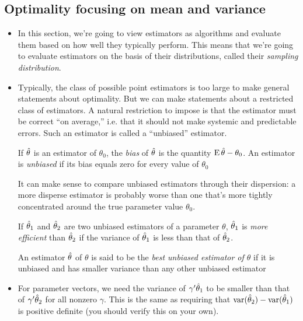 \subsection{Optimality focusing on mean and variance}

\begin{itemize}[leftmargin=0pt]

\item In this section, we're going to view estimators as algorithms
  and evaluate them based on how well they typically perform.  This
  means that we're going to evaluate estimators on the basis of their
  distributions, called their \emph{sampling distribution}.  

\item Typically, the class of possible point estimators is too large
  to make general statements about optimality.  But we can make
  statements about a restricted class of estimators.  A natural
  restriction to impose is that the estimator must be correct ``on
  average,'' i.e. that it should not make systemic and predictable
  errors.  Such an estimator is called a ``unbiased'' estimator.

  \begin{defn}
    If $\hat{\theta}$ is an estimator of $\theta_0$, the \emph{bias} of $\hat{\theta}$ is the
    quantity $\operatorname{E} \hat{\theta} - \theta_0$.  An estimator is \emph{unbiased} if its
    bias equals zero for every value of $\theta_0$
  \end{defn}

  It can make sense to compare unbiased estimators through their
  dispersion: a more disperse estimator is probably worse than one
  that's more tightly concentrated around the true parameter value
  $\theta_0$.

  \begin{defn}
    If $\hat{\theta}_1$ and $\hat{\theta}_2$ are two unbiased estimators of a parameter
    $\theta$, $\hat{\theta}_1$ is \emph{more efficient} than $\hat{\theta}_2$ if the variance
    of $\hat{\theta}_1$ is less than that of $\hat{\theta}_2$.
  \end{defn}

  An estimator $\hat{\theta}$ of $\theta$ is said to be the \emph{best unbiased
  estimator of $\theta$} if it is unbiased and has smaller variance than
  any other unbiased estimator

\item For parameter vectors, we need the variance of $\gamma'\hat{\theta}_1$ to be
  smaller than that of $\gamma'\hat{\theta}_2$ for all nonzero $\gamma$.  This is the same
  as requiring that $\operatorname{var}(\hat{\theta}_2) - \operatorname{var}(\hat{\theta}_1)$ is positive definite
  (you should verify this on your own).


\end{itemize}
